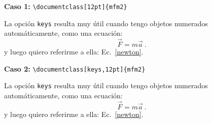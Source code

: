\documentclass[12pt,keys]{mfm2}
\begin{document}
\noindent
{\bf Caso 1:} \verb+\documentclass[12pt]{mfm2}+
\vspace{.5cm}

La opci\'on \verb+keys+ resulta muy \'util cuando tengo objetos numerados
autom\'aticamente, como una ecuaci\'on:
\begin{equation}
  \vec F = m \vec a \ . 
\end{equation}
y luego quiero referirme a ella: Ec.\  \eqref{newton}.

\vspace{2cm}
\addtocounter{equation}{-1}

\noindent
{\bf Caso 2:} \verb+\documentclass[keys,12pt]{mfm2}+
\vspace{.5cm}

La opci\'on \verb+keys+ resulta muy \'util cuando tengo objetos numerados
autom\'aticamente, como una ecuaci\'on:
\begin{equation}
  \label{newton}
  \vec F = m \vec a \ . 
\end{equation}
y luego quiero referirme a ella: Ec.\  \eqref{newton}.
\end{document}
